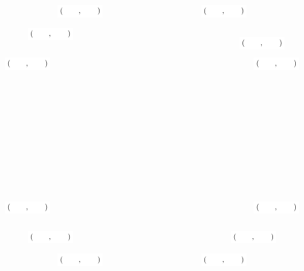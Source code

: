 \documentclass[12pt,letterpaper]{exam}
\begin{document}
\begin{questions}
\[\begin{tikzpicture}[scale=5.5,cap=round,>=latex]
	\foreach \x/\xtext/\y in {
		30/\hspace{.75cm}/\hspace{.75cm},
		40/\hspace{.75cm}/\hspace{.75cm},
		60/\hspace{.75cm}/\hspace{.75cm},
		150/\hspace{.75cm}/\hspace{.75cm},
		135/\hspace{.75cm}/\hspace{.75cm},
		120/\hspace{.75cm}/\hspace{.75cm},
		210/\hspace{.75cm}/\hspace{.75cm},
		225/\hspace{.75cm}/\hspace{.75cm},
		240/\hspace{.75cm}/\hspace{.75cm},
		330/\hspace{.75cm}/\hspace{.75cm},
		315/\hspace{.75cm}/\hspace{.75cm},
		300/\hspace{.75cm}/\hspace{.75cm}}
		\draw (\x:1.25cm) node[fill=white] {$\left(\xtext,\y\right)$};

	\end{tikzpicture}
	\]



\newpage
{} \par\vspace{0.3cm}


\end{questions}
\end{document}
